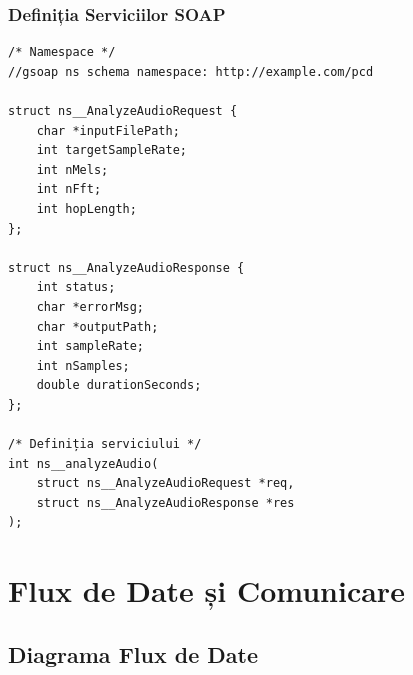 \documentclass[12pt,a4paper,oneside]{book}
\begin{document}
\subsection{Definiția Serviciilor SOAP}

\begin{lstlisting}[caption=Exemplu WSDL/IDL gSOAP]
/* Namespace */
//gsoap ns schema namespace: http://example.com/pcd

struct ns__AnalyzeAudioRequest {
    char *inputFilePath;
    int targetSampleRate;
    int nMels;
    int nFft;
    int hopLength;
};

struct ns__AnalyzeAudioResponse {
    int status;
    char *errorMsg;
    char *outputPath;
    int sampleRate;
    int nSamples;
    double durationSeconds;
};

/* Definiția serviciului */
int ns__analyzeAudio(
    struct ns__AnalyzeAudioRequest *req,
    struct ns__AnalyzeAudioResponse *res
);
\end{lstlisting}

\newpage

\chapter{Flux de Date și Comunicare}

\section{Diagrama Flux de Date}
\end{document}
